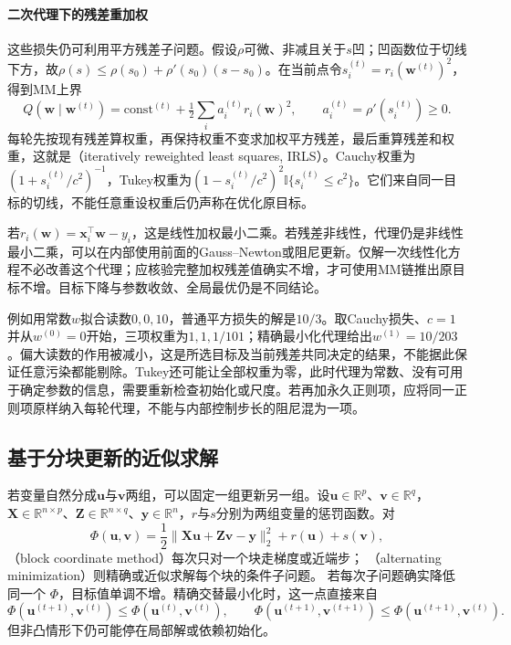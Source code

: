 \paragraph{二次代理下的残差重加权}
\label{sec:opt-irls}

这些损失仍可利用平方残差子问题。假设$\rho$可微、非减且关于$s$凹；凹函数位于切线下方，故$\rho(s)\leq\rho(s_0)+\rho'(s_0)(s-s_0)$。在当前点令$s_i^{(t)}=r_i(\bm w^{(t)})^2$，得到MM上界
\begin{equation}
 Q(\bm w\mid\bm w^{(t)})
 =\mathrm{const}^{(t)}+\tfrac12\sum_i a_i^{(t)}r_i(\bm w)^2,
 \qquad a_i^{(t)}=\rho'(s_i^{(t)})\geq0.
 \label{eq:opt-irls-majorizer}
\end{equation}
每轮先按现有残差算权重，再保持权重不变求加权平方残差，最后重算残差和权重，这就是（iteratively reweighted least squares, IRLS）。Cauchy权重为$(1+s_i^{(t)}/c^2)^{-1}$，Tukey权重为$(1-s_i^{(t)}/c^2)^2\mathbb I\{s_i^{(t)}\leq c^2\}$。它们来自同一目标的切线，不能任意重设权重后仍声称在优化原目标。

若$r_i(\bm w)=\bm x_i^\top\bm w-y_i$，这是线性加权最小二乘。若残差非线性，代理仍是非线性最小二乘，可以在内部使用前面的Gauss--Newton或阻尼更新。仅解一次线性化方程不必改善这个代理；应核验完整加权残差值确实不增，才可使用MM链推出原目标不增。目标下降与参数收敛、全局最优仍是不同结论。

例如用常数$w$拟合读数$0,0,10$，普通平方损失的解是$10/3$。取Cauchy损失、$c=1$并从$w^{(0)}=0$开始，三项权重为$1,1,1/101$；精确最小化代理给出$w^{(1)}=10/203$。偏大读数的作用被减小，这是所选目标及当前残差共同决定的结果，不能据此保证任意污染都能剔除。Tukey还可能让全部权重为零，此时代理为常数、没有可用于确定参数的信息，需要重新检查初始化或尺度。若再加永久正则项，应将同一正则项原样纳入每轮代理，不能与内部控制步长的阻尼混为一项。


\subsection{基于分块更新的近似求解}
\label{sec:opt-block-alternating-distribution}

若变量自然分成$\bm{u}$与$\bm{v}$两组，可以固定一组更新另一组。设$\bm u\in\mathbb R^p$、$\bm v\in\mathbb R^q$，$\bm X\in\mathbb R^{n\times p}$、$\bm Z\in\mathbb R^{n\times q}$、$\bm y\in\mathbb R^n$，$r$与$s$分别为两组变量的惩罚函数。对
\[
  \Phi(\bm{u},\bm{v})
  =\frac12\lVert\bm{X}\bm{u}+\bm{Z}\bm{v}-\bm{y}\rVert_2^2
  +r(\bm{u})+s(\bm{v}),
\]
（block coordinate method）每次只对一个块走梯度或近端步；
（alternating minimization）则精确或近似求解每个块的条件子问题。
若每次子问题确实降低同一个
$\Phi$，目标值单调不增。精确交替最小化时，这一点直接来自
\[
  \Phi(\bm{u}^{(t+1)},\bm{v}^{(t)})
  \leq\Phi(\bm{u}^{(t)},\bm{v}^{(t)}),\qquad
  \Phi(\bm{u}^{(t+1)},\bm{v}^{(t+1)})
  \leq\Phi(\bm{u}^{(t+1)},\bm{v}^{(t)}).
\]
但非凸情形下仍可能停在局部解或依赖初始化。

